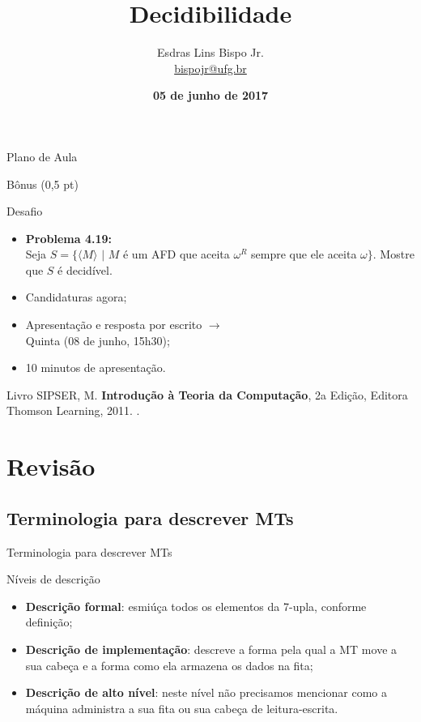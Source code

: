 \documentclass[xcolor=dvipsnames,table]{beamer}
\title{Decidibilidade}
\author{
  Esdras Lins Bispo Jr. \\ \url{bispojr@ufg.br}
  }
\institute{
  Teoria da Computação \\Bacharelado em Ciência da Computação}
\date{\textbf{05 de junho de 2017} }
\begin{document}
	\begin{frame}
		\titlepage
	\end{frame}

	\AtBeginSection{
		\begin{frame}{Sumário}%
    		\tableofcontents[currentsection]
		\end{frame}
	}

	\begin{frame}{Plano de Aula}
		\tableofcontents
	\end{frame}
	
	\begin{frame}{Bônus (0,5 pt)}
		\begin{block}{Desafio}
			\begin{itemize}
			\item {\bf Problema 4.19:} \\Seja $S = \{ \langle M \rangle \mbox{ | } M$ é um AFD que aceita $\omega^R$ sempre que ele aceita $\omega \}$. Mostre que $S$ é decidível.
				\item Candidaturas agora; 
				\item Apresentação e resposta por escrito $\rightarrow$ \\Quinta (08 de junho, 15h30); 
				\item 10 minutos de apresentação.
			\end{itemize}
		\end{block} 
		\begin{block}{Livro}
			SIPSER, M. {\bf Introdução à Teoria da Computação}, 2a Edição, Editora Thomson Learning, 2011. \color{blue}{\bf Código Bib.: [004 SIP/int]}.
		\end{block}
	\end{frame}
    
    \section{Revisão}
	
	\subsection{Terminologia para descrever MTs}
	\begin{frame}{Terminologia para descrever MTs}
		\begin{block}{Níveis de descrição}
			\begin{itemize}
				\item {\bf Descrição formal}: esmiúça todos os elementos da 7-upla, conforme definição;
				\item {\bf Descrição de implementação}: descreve a forma pela qual a MT move a sua cabeça e a forma como ela armazena os dados na fita;
				\item {\bf Descrição de alto nível}: neste nível não precisamos mencionar como a máquina administra a sua fita ou sua cabeça de leitura-escrita.
			\end{itemize}
		\end{block}
	\end{frame}
	
\end{document}
